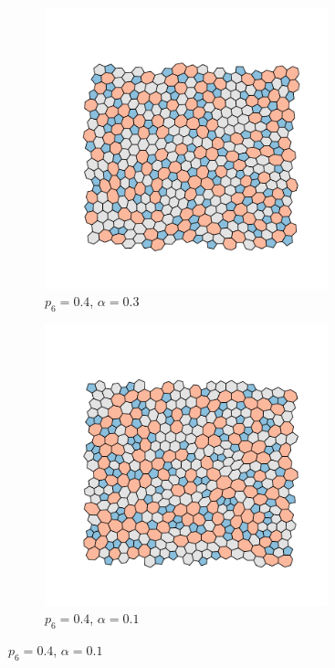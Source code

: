\begin{figure}[bt]
     \centering
     
     \begin{subfigure}[b]{0.45\textwidth}
         \centering
         \includegraphics[width=0.9\textwidth]{./figures/targeted_opt/topt_30.pdf}
         \caption{$p_6=0.4$, $\alpha=0.3$}
         \label{fig:toptconfigs1}
     \end{subfigure}
     \hfill
     \begin{subfigure}[b]{0.45\textwidth}
         \centering
         \includegraphics[width=0.9\textwidth]{./figures/targeted_opt/topt_10.pdf}
         \caption{$p_6=0.4$, $\alpha=0.1$}
         \label{fig:toptconfigs2}
     \end{subfigure}
     

\end{figure}
